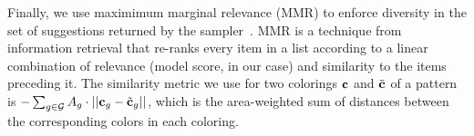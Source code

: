 %
%

Finally, we use maximimum marginal relevance (MMR) to enforce diversity in the set of suggestions returned by the sampler~\cite{MMR}. MMR is a technique from information retrieval that re-ranks every item in a list according to a linear combination of relevance (model score, in our case) and similarity to the items preceding it. The similarity metric we use for two colorings $\mathbf{c}$ and $\tilde{\mathbf{c}}$ of a pattern is $- \sum_{g \in \mathcal{G}} {A_g \cdot ||\mathbf{c}_g - \tilde{\mathbf{c}}_g||}$, which is the area-weighted sum of \lab distances between the corresponding colors in each coloring.

